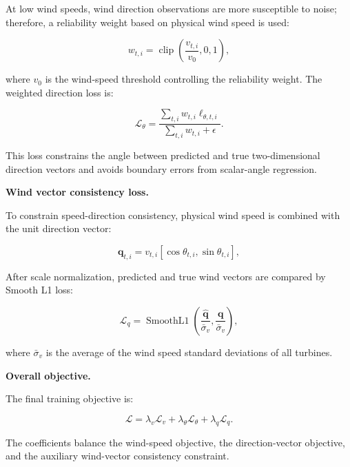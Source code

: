 At low wind speeds, wind direction observations are more susceptible to noise; therefore, a reliability weight based on physical wind speed is used:

\begin{equation}
w_{t,i} = \operatorname{clip} \left( \frac{v_{t,i}}{v_0}, 0, 1 \right),
\end{equation}

where $v_0$ is the wind-speed threshold controlling the reliability weight. The weighted direction loss is:

\begin{equation}
\mathcal{L}_{\theta} = \frac{\sum_{t,i}w_{t,i}\ell_{\theta,t,i}}{\sum_{t,i}w_{t,i}+\epsilon}.
\end{equation}

This loss constrains the angle between predicted and true two-dimensional direction vectors and avoids boundary errors from scalar-angle regression.

\textbf{Wind vector consistency loss.}

To constrain speed-direction consistency, physical wind speed is combined with the unit direction vector:

\begin{equation}
\mathbf{q}_{t,i} = v_{t,i} \left[ \cos\theta_{t,i}, \sin\theta_{t,i} \right],
\end{equation}

After scale normalization, predicted and true wind vectors are compared by Smooth L1 loss:

\begin{equation}
\mathcal{L}_{q} = \operatorname{SmoothL1} \left( \frac{\hat{\mathbf{q}}}{\bar{\sigma}_v}, \frac{\mathbf{q}}{\bar{\sigma}_v} \right),
\end{equation}

where $\bar{\sigma}_v$ is the average of the wind speed standard deviations of all turbines.

\textbf{Overall objective.}

The final training objective is:

\begin{equation}
\mathcal{L} = \lambda_v\mathcal{L}_{v} + \lambda_\theta\mathcal{L}_{\theta} + \lambda_q\mathcal{L}_{q}.
\end{equation}

The coefficients balance the wind-speed objective, the direction-vector objective, and the auxiliary wind-vector consistency constraint.
